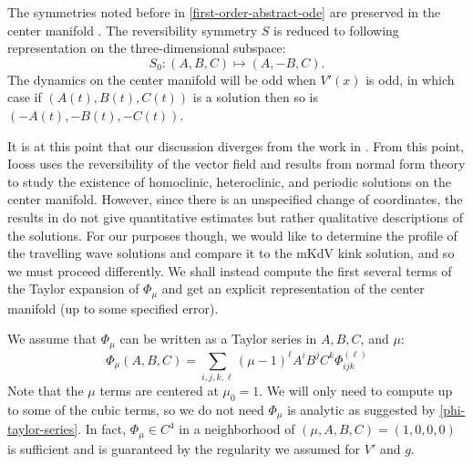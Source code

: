 The symmetries noted before in \cref{first-order-abstract-ode} are preserved in the center manifold \cite{vanderbauwhede1992center}. The reversibility symmetry \(S\) is reduced to following representation on the three-dimensional subspace:
\begin{equation}
	S_0: (A, B, C) \mapsto (A, -B, C).
\end{equation}
The dynamics on the center manifold will be odd when \(V'(x)\) is odd, in which case if  \((A(t),B(t),C(t))\) is a solution then so is \((-A(t), -B(t), -C(t))\).

It is at this point that our discussion diverges from the work in \cite{iooss2000travelling}. From this point, Iooss uses the reversibility of the vector field and results from normal form theory to study the existence of homoclinic, heteroclinic, and periodic solutions on the center manifold. However, since there is an unspecified change of coordinates, the results in \cite{iooss2000travelling} do not give quantitative estimates but rather qualitative descriptions of the solutions. For our purposes though, we would like to determine the profile of the travelling wave solutions and compare it to the mKdV kink solution, and so we must proceed differently. We shall instead compute the first several terms of the Taylor expansion of \(\Phi_\mu\) and get an explicit representation of the center manifold (up to some specified error).


We assume that \(\Phi_\mu\) can be written as a Taylor series in \(A,B,C\), and \(\mu\):
\begin{equation}\label{phi-taylor-series}
	\Phi_\mu(A,B,C) = \sum_{i,j,k,\ell} (\mu - 1)^\ell A^i B^j C^k \Phi^{(\ell)}_{ijk} 
\end{equation}
Note that the \(\mu\) terms are centered at \(\mu_0 = 1\). We will only need to compute up to some of the cubic terms, so we do not need \(\Phi_\mu\) is analytic as suggested by \cref{phi-taylor-series}. In fact, \(\Phi_\mu \in C^4\) in a neighborhood of \((\mu, A, B, C) = (1,0,0,0)\) is sufficient and is guaranteed by the regularity we assumed for \(V'\) and \(g\).

